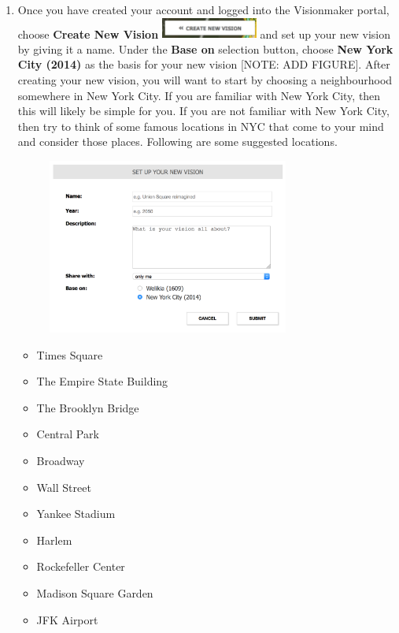 \documentclass{article}
\begin{document}
\begin{enumerate}[leftmargin=15mm]

\item Once you have created your account and logged into the Visionmaker portal, choose \textbf{Create New Vision} \includegraphics[width=0.25\textwidth]{create_vision.png} and set up your new vision by giving it a name.  Under the \textbf{Base on} selection button, choose \textbf{New York City (2014)} as the basis for your new vision [NOTE: ADD FIGURE].  After creating your new vision, you will want to start by choosing a neighbourhood somewhere in New York City.  If you are familiar with New York City, then this will likely be simple for you.  If you are not familiar with New York City, then try to think of some famous locations in NYC that come to your mind and consider those places.  Following are some suggested locations.

\begin{figure}[t!]
\begin{center}
\includegraphics[width=0.75\textwidth]{vision_setup.png}
\end{center}
\end{figure}

\begin{itemize}

\item Times Square
\item The Empire State Building
\item The Brooklyn Bridge
\item Central Park
\item Broadway
\item Wall Street
\item Yankee Stadium
\item Harlem
\item Rockefeller Center
\item Madison Square Garden
\item JFK Airport


\end{itemize}
\end{enumerate}
\end{document}
